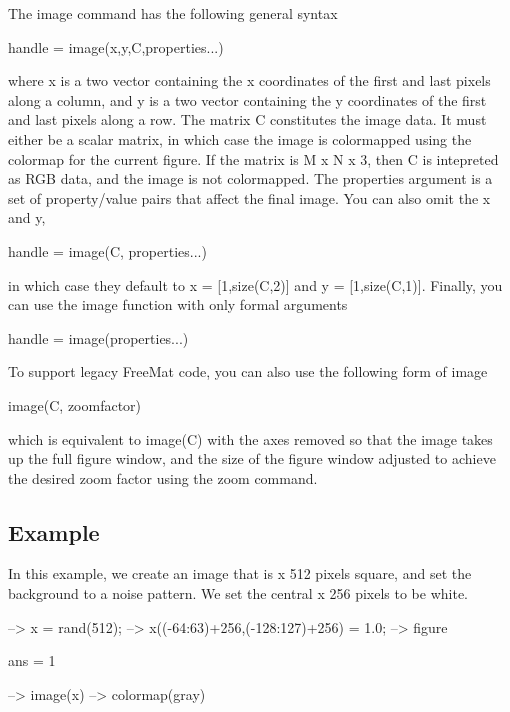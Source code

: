 The {\ttfamily image} command has the following general syntax \begin{DoxyVerb}  handle = image(x,y,C,properties...)
\end{DoxyVerb}
 where {\ttfamily x} is a two vector containing the {\ttfamily x} coordinates of the first and last pixels along a column, and {\ttfamily y} is a two vector containing the {\ttfamily y} coordinates of the first and last pixels along a row. The matrix {\ttfamily C} constitutes the image data. It must either be a scalar matrix, in which case the image is colormapped using the {\ttfamily colormap} for the current figure. If the matrix is {\ttfamily M x N x 3}, then {\ttfamily C} is intepreted as R\-G\-B data, and the image is not colormapped. The {\ttfamily properties} argument is a set of {\ttfamily property/value} pairs that affect the final image. You can also omit the {\ttfamily x} and {\ttfamily y}, \begin{DoxyVerb}  handle = image(C, properties...)
\end{DoxyVerb}
 in which case they default to {\ttfamily x = \mbox{[}1,size(\-C,2)\mbox{]}} and {\ttfamily y = \mbox{[}1,size(\-C,1)\mbox{]}}. Finally, you can use the {\ttfamily image} function with only formal arguments \begin{DoxyVerb}  handle = image(properties...)
\end{DoxyVerb}


To support legacy Free\-Mat code, you can also use the following form of {\ttfamily image} \begin{DoxyVerb}  image(C, zoomfactor)
\end{DoxyVerb}
 which is equivalent to {\ttfamily image(\-C)} with the axes removed so that the image takes up the full figure window, and the size of the figure window adjusted to achieve the desired zoom factor using the {\ttfamily zoom} command. \hypertarget{variables_struct_Example}{}\subsection{Example}\label{variables_struct_Example}
In this example, we create an image that is { x 512} pixels square, and set the background to a noise pattern. We set the central { x 256} pixels to be white.


\begin{DoxyVerbInclude}
--> x = rand(512);
--> x((-64:63)+256,(-128:127)+256) = 1.0;
--> figure

ans = 
 1 

--> image(x)
--> colormap(gray)
\end{DoxyVerbInclude}


